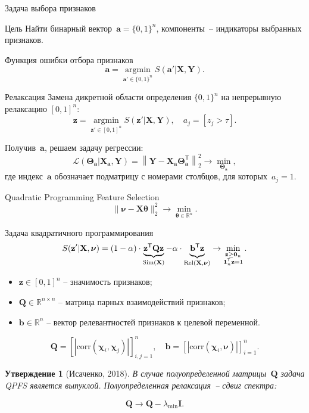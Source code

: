 \documentclass[9pt]{beamer}
\newcommand{\bz}{\mathbf{z}}
\newcommand{\ba}{\mathbf{a}}
\newcommand{\bb}{\mathbf{b}}
\newcommand{\bY}{\mathbf{Y}}
\newcommand{\bX}{\mathbf{X}}
\newcommand{\bQ}{\mathbf{Q}}
\newcommand{\bbR}{\mathbb{R}}
\newcommand{\bchi}{\boldsymbol{\chi}}
\newcommand{\bnu}{\boldsymbol{\nu}}
\newcommand{\bOne}{\boldsymbol{1}}
\newcommand{\bZero}{\boldsymbol{0}}
\newcommand{\btheta}{\boldsymbol{\theta}}
\newcommand{\bTheta}{\boldsymbol{\Theta}}
\newcommand{\argmin}{\mathop{\arg \min}\limits}
\newcommand{\T}{\mathsf{T}}
\newtheorem{statement}{Утверждение}
\begin{document}
\begin{frame}{Задача выбора признаков}
\begin{block}{Цель}
Найти бинарный вектор~$\ba = \{0, 1\}^n$, компоненты~-- индикаторы выбранных признаков. 
\end{block}
\begin{block}{Функция ошибки отбора признаков}
	\vspace{-0.2cm}
\[
\ba = \argmin_{\ba' \in \{0, 1\}^n} S(\ba' | \bX, \bY).
\]
\vspace{-0.5cm}
\end{block}
\begin{block}{Релаксация}
	Замена дикретной области определения $\{0, 1\}^n$ на непрерывную релаксацию $[0, 1]^n$:
	\[
	\bz = \argmin_{\bz' \in [0, 1]^n} S(\bz' | \bX, \bY), \quad 
	a_j = [z_j > \tau].
\]
\end{block}
Получив~$\ba$, решаем задачу регрессии:
\[
\mathcal{L}(\bTheta_{\ba} | \bX_{\ba}, \bY) = {\left\| \mathbf{Y} - \bX_{\ba}\bTheta^{\T}_{\ba} \right\| }_2^2 \rightarrow\min_{\bTheta_{\ba}},
\]
где индекс~$\ba$ обозначает подматрицу с номерами столбцов, для которых~$a_j = 1$.
\end{frame}
\begin{frame}{Quadratic Programming Feature Selection}
	\[
	\| \bnu - \bX \btheta\|_2^2 \rightarrow\min_{\btheta \in \bbR^{n}}.
	\]
	\vspace{-0.3cm}
	\begin{block}{Задача квадратичного программирования}
	\vspace{-0.3cm}
	\[
	S(\bz' | \bX, \bnu)	= (1 - \alpha) \cdot \underbrace{\bz^{\T} \bQ \bz}_{\text{Sim}(\bX)} - \alpha \cdot \underbrace{\vphantom{()} \mathbf{b}^{\T} \bz}_{\text{Rel}(\bX, \bnu)} \rightarrow \min_{\substack{\bz \geq \bZero_n \\ \bOne_n^{\T} \bz=1}}.
	\]
	\end{block}
		\begin{itemize}
			\item $\bz \in [0, 1]^n$ -- значимость признаков;
			\item $\bQ \in \bbR^{n \times n}$ -- матрица парных взаимодействий признаков;
			\item $\mathbf{b} \in \bbR^n$ -- вектор релевантностей признаков к целевой переменной.
		\end{itemize}
		\[
		\bQ = \left[\left|\text{corr}(\bchi_i, \bchi_j)\right|\right]_{i,j=1}^n, \quad
		\bb = \left[\left|\text{corr}(\bchi_i, \bnu)\right|\right]_{i=1}^n.
		\]
\vspace{-0.2cm}
\begin{statement}[Исаченко, 2018]
	В случае полуопределенной матрицы~$\bQ$ задача QPFS является выпуклой. 
	Полуопределенная релаксация~-- сдвиг спектра:
\end{statement}
\begin{equation*}
\bQ \rightarrow \bQ - \lambda_{\min} \mathbf{I}.
\end{equation*}
\end{frame}
\end{document}
